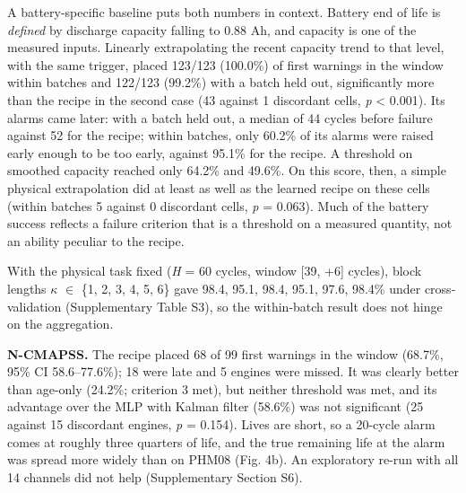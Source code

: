\documentclass[a4paper,fleqn,doubleblind]{cas-dc}
\begin{document}
A battery-specific baseline puts both numbers in context. Battery end of life is \textit{defined} by discharge capacity falling to 0.88 Ah, and capacity is one of the measured inputs. Linearly extrapolating the recent capacity trend to that level, with the same trigger, placed 123/123 (100.0\%) of first warnings in the window within batches and 122/123 (99.2\%) with a batch held out, significantly more than the recipe in the second case (43 against 1 discordant cells, \textit{p} < 0.001). Its alarms came later: with a batch held out, a median of 44 cycles before failure against 52 for the recipe; within batches, only 60.2\% of its alarms were raised early enough to be too early, against 95.1\% for the recipe. A threshold on smoothed capacity reached only 64.2\% and 49.6\%. On this score, then, a simple physical extrapolation did at least as well as the learned recipe on these cells (within batches 5 against 0 discordant cells, \textit{p} = 0.063). Much of the battery success reflects a failure criterion that is a threshold on a measured quantity, not an ability peculiar to the recipe.

With the physical task fixed (\textit{H} = 60 cycles, window [\textminus{}39, +6] cycles), block lengths $\kappa$ $\in$ \{1, 2, 3, 4, 5, 6\} gave 98.4, 95.1, 98.4, 95.1, 97.6, 98.4\% under cross-validation (Supplementary Table S3), so the within-batch result does not hinge on the aggregation.

\textbf{N-CMAPSS.} The recipe placed 68 of 99 first warnings in the window (68.7\%, 95\% CI 58.6--77.6\%); 18 were late and 5 engines were missed. It was clearly better than age-only (24.2\%; criterion 3 met), but neither threshold was met, and its advantage over the MLP with Kalman filter (58.6\%) was not significant (25 against 15 discordant engines, \textit{p} = 0.154). Lives are short, so a 20-cycle alarm comes at roughly three quarters of life, and the true remaining life at the alarm was spread more widely than on PHM08 (Fig. 4b). An exploratory re-run with all 14 channels did not help (Supplementary Section S6).
\end{document}
